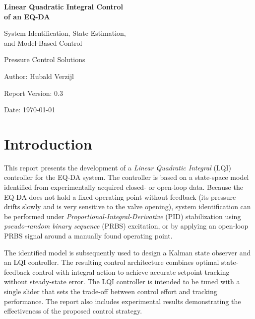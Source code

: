 \documentclass[12pt,a4paper]{article}
\newcommand{\CompanyName}{Pressure Control Solutions}
\newcommand{\ReportTitle}{Linear Quadratic Integral Control\\of an EQ-DA}
\newcommand{\ReportSubTitle}{System Identification, State Estimation,\\and Model-Based Control}
\newcommand{\AuthorName}{Hubald Verzijl}
\newcommand{\VersionNumber}{0.3}
\newcommand{\ReportDate}{\today}
\begin{document}
\begin{titlepage}
    \thispagestyle{fancy}
    \fancyfoot{} %
    \centering
    \vspace*{2cm}
    {\Huge \bfseries \ReportTitle \par}
    \vspace{0.5cm}
    {\Large \ReportSubTitle \par}
    \vspace{2cm}
    \vspace{2cm}
    {\Large \CompanyName \par}
    \vspace{0.25cm}
    {\small Author: \AuthorName \par}
    \vspace{0.25cm}
    {\small Report Version: \VersionNumber \par}
    \vspace{0.25cm}
    {\small Date: \ReportDate \par}
    \vfill
\end{titlepage}

\section*{Introduction}
This report presents the development of a \textit{Linear Quadratic Integral} (LQI) controller for the EQ-DA system. The controller is based on a state-space model identified from experimentally acquired closed- or open-loop data. Because the EQ-DA does not hold a fixed operating point without feedback (its pressure drifts slowly and is very sensitive to the valve opening), system identification can be performed under \textit{Proportional-Integral-Derivative} (PID) stabilization using \textit{pseudo-random binary sequence} (PRBS) excitation, or by applying an open-loop PRBS signal around a manually found operating point.

The identified model is subsequently used to design a Kalman state observer and an LQI controller. The resulting control architecture combines optimal state-feedback control with integral action to achieve accurate setpoint tracking without steady-state error. The LQI controller is intended to be tuned with a single slider that sets the trade-off between control effort and tracking performance. The report also includes experimental results demonstrating the effectiveness of the proposed control strategy.
\end{document}
